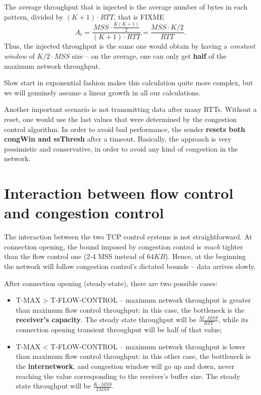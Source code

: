 \documentclass[10pt]{book}
\begin{document}
The average throughput that is injected is the average number of bytes in each
pattern, divided by $(K + 1)\cdot RTT$, that is FIXME
$$A_t = \frac{MSS\cdot \frac{K(K+1)}{2}}{(K+1)\cdot RTT} = \frac{MSS\cdot
K/2}{RTT}.$$ Thus, the injected throughput is the same one would obtain by
having a \emph{constant window} of $K/2 \cdot MSS$ size \--- on the average,
one can only get \textbf{half} of the maximum network throughput.

Slow start in exponential fashion makes this calculation quite more complex,
but we will genuinely assume a linear growth in all our calculations.

Another important scenario is not transmitting data after many RTTs. Without a
reset, one would use the last values that were determined by the congestion
control algorithm. In order to avoid bad performance, the sender \textbf{resets
both congWin and ssThresh} after a timeout. Basically, the approach is very
pessimistic and conservative, in order to avoid any kind of congestion in the
network.

\section{Interaction between flow control and congestion control}

The interaction between the two TCP control systems is not straightforward. At
connection opening, the bound imposed by congestion control is \emph{much}
tighter than the flow control one (2-4 MSS instead of $64KB$). Hence, at the
beginning the network will follow congestion control's dictated bounds \---
data arrives slowly.

After connection opening (steady-state), there are two possible cases:
\begin{itemize}
    \item T-MAX > T-FLOW-CONTROL \--- maximum network throughput is greater
        than maximum flow control throughput: in this case, the bottleneck is
        the \textbf{receiver's capacity}. The steady state throughput will be
        $\frac{M\cdot MSS}{RTT}$, while its connection opening transient
        throughput will be half of that value;
    \item T-MAX < T-FLOW-CONTROL \--- maximum network throughput is lower
        than maximum flow control throughput: in this other case, the
        bottleneck is the \textbf{internetwork}, and congestion window will go
        up and down, never reaching the value corresponding to the receiver's
        buffer size. The steady state throughput will be $\frac{K\cdot
        MSS}{2MSS}$.
\end{itemize}
\end{document}
